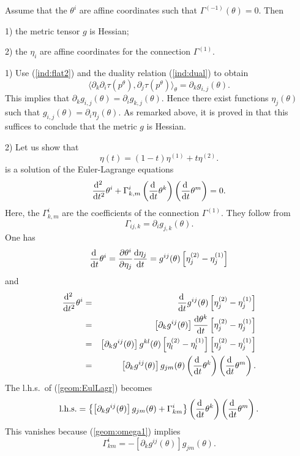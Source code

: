 \documentclass[graybox]{svmult}
\newcommand{\be}{\begin{equation}}
\newcommand{\ee}{\end{equation}}
\newcommand{\beq}{\begin{eqnarray}}
\newcommand{\eeq}{\end{eqnarray}}
\newcommand{\beginproof}{\par\strut\vskip 0.0cm\noindent{\bf Proof}\par}
\newcommand{\upd}{{\rm d}}
\begin{document}
\begin{theorem}
Assume that the $\theta^i$ are affine coordinates such that $\Gamma^{(-1)} (\theta) = 0$. 
Then 
\begin{description}
 \item 1) the metric tensor $g$ is Hessian;
 \item 2) the $\eta_i$ are affine coordinates for the connection $\Gamma^{(1)}$.
\end{description}
 
\end{theorem}

\beginproof

1)
Use (\ref {ind:flat2}) and the duality relation (\ref{ind:dual}) to obtain
\be
\langle\partial_k\partial_i\tau(p^\theta),\partial_j\tau(p^\theta)\rangle_\theta
=\partial_k g_{i,j}(\theta).
\nonumber
\ee
This implies that $\partial_k g_{i,j}(\theta)=\partial_i g_{k,j}(\theta)$.
Hence there exist functions $\eta_j(\theta)$ such that
$g_{i,j}(\theta)=\partial_i\eta_j(\theta)$. As remarked above, it is proved in
\cite{NZ17} that this suffices to conclude that the metric $g$ is Hessian.


2)
Let us show that
\be
\eta(t)=(1-t)\eta^{(1)}+t\eta^{(2)}.
\label{geom:etaflat}
\ee
is a solution of the Euler-Lagrange equations
\be
\frac{\upd^2\,}{\upd t^2}\theta^i
+\Gamma^i_{k,m}
\left(\frac{\upd\,}{\upd t}\theta^k\right)
\left(\frac{\upd\,}{\upd t}\theta^m\right)
=0.
\label{geom:EulLagr}
\ee
Here, the $\Gamma^i_{k,m}$ are the coefficients of the connection $\Gamma^{(1)}$.
They follow from
\be
\Gamma_{ij,k}=\partial_ig_{j,k}(\theta).
\label {geom:omega1}
\ee
One has
\be
\frac{\upd\,}{\upd t}\theta^i
=\frac{\partial\theta^i}{\partial\eta_j}\frac{\upd\eta_j}{\upd t}
=g^{ij}(\theta)\left[\eta^{(2)}_j-\eta^{(1)}_j\right]
\nonumber
\ee
and
\beq
\frac{\upd^2\,}{\upd t^2}\theta^i
&=&
\frac{\upd\,}{\upd t}g^{ij}(\theta)\left[\eta^{(2)}_j-\eta^{(1)}_j\right]\cr
&=&
\left[\partial_kg^{ij}(\theta)\right]\frac{\upd\theta^k}{\upd t}\left[\eta^{(2)}_j-\eta^{(1)}_j\right]\cr
&=&
\left[\partial_kg^{ij}(\theta)\right]g^{kl}(\theta)
\left[\eta^{(2)}_l-\eta^{(1)}_l\right]
\left[\eta^{(2)}_j-\eta^{(1)}_j\right]\cr
&=&
\left[\partial_kg^{ij}(\theta)\right]g_{jm}(\theta)
\left(\frac{\upd\,}{\upd t}\theta^k\right)
\left(\frac{\upd\,}{\upd t}\theta^m\right).
\nonumber
\eeq
The l.h.s.~of (\ref {geom:EulLagr}) becomes
\be
\mbox{l.h.s.}
=
\left\{
\left[\partial_kg^{ij}(\theta)\right]g_{jm}(\theta)
+\Gamma^i_{km}
\right\}
\left(\frac{\upd\,}{\upd t}\theta^k\right)
\left(\frac{\upd\,}{\upd t}\theta^m\right).
\nonumber
\ee
This vanishes because (\ref {geom:omega1}) implies
\be
\Gamma^i_{km}=-\left[\partial_kg^{ij}(\theta)\right]g_{jm}(\theta).
\nonumber
\ee
\end{document}

